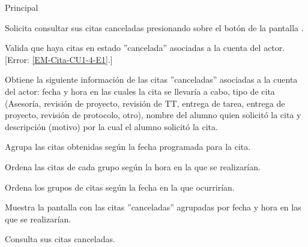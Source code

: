 \begin{UCtrayectoria}{Principal}

	\UCpaso [\UCactor] Solicita consultar sus citas canceladas presionando sobre el botón  de la pantalla .

	\UCpaso Valida que haya citas en estado ''cancelada'' asociadas a la cuenta del actor. [Error: \ref{EM-Cita-CU1-4-E1}.]

	\UCpaso Obtiene la siguiente información de las citas ''canceladas'' asociadas a la cuenta del actor: fecha y hora en las cuales la cita se llevaría a cabo, tipo de cita (Asesoría, revisión de proyecto, revisión de TT, entrega de tarea, entrega de proyecto, revisión de protocolo, otro), nombre del alumno quien solicitó la cita y descripción (motivo) por la cual el alumno solicitó la cita.

	\UCpaso Agrupa las citas obtenidas según la fecha programada para la cita.

	\UCpaso Ordena las citas de cada grupo según la hora en la que se realizarían. 

	\UCpaso Ordena los grupos de citas según la fecha en la que ocurrirían.

	\UCpaso Muestra la pantalla  con las citas ''canceladas'' agrupadas por fecha y hora en las que se realizarían. 

	\UCpaso [\UCactor] Consulta sus citas canceladas. 

\end{UCtrayectoria}
